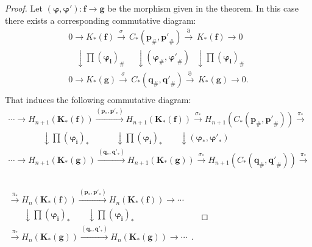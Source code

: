 \documentclass[10pt]{article}
\theoremstyle{definition}
\begin{document}
\begin{proof} Let $\left( {{\mathbf{\varphi }}},\mathbf{{\varphi}' } \right) : { \mathbf{f}} \to {\mathbf{g}}$ be the morphism given in the theorem. In this case there exists a corresponding commutative diagram:
$$
\begin{matrix}
   0\to K_{*} \left( \mathbf{f} \right)\overset{\sigma }{\mathop{\to }}\,{{C}_{*}}\left( {{\mathbf{p}}_{\#}},\mathbf{p'}_{\#} \right)\overset{\partial }{\mathop{\to }}\,K_{*}\left( \mathbf{f} \right)\to 0  \\
   ~~~~\downarrow \prod (\mathbf{\varphi_{i}})_{\#}~~~~~~\downarrow \left( {{\mathbf{\varphi }}_{\#}},\mathbf{{\varphi}' }_{\#} \right)~~~\downarrow \prod (\mathbf{\varphi_{i}})_{\#}  \\
   0\to K_{*} \left( \mathbf{g} \right)\overset{\sigma }{\mathop{\to }}\,{{C}_{*}}\left( {{\mathbf{q}}_{\#}},\mathbf{q'}_{\#} \right)\overset{\partial }{\mathop{\to }}\,K_{*}\left( \mathbf{g} \right)\to 0.  \\
\end{matrix}
$$
That induces the following commutative diagram:
$$
\begin{matrix}
   \cdots \to H_{n+1}(\mathbf K_{*}( \mathbf{f})){{\stackrel{(\mathbf p_{*},\mathbf {p'}_{*})}{\longrightarrow}}} H_{n+1}(\mathbf K_{*}( \mathbf{f})){{\stackrel{\sigma
_{*}}{\longrightarrow}}}H_{n+1}(C_{*}(\mathbf p_\#,{\mathbf {p'}}_{\#}))  {{\stackrel{\pi _{*}}{\longrightarrow}}} \\
   ~~~~~~~~~~~~~~~~~~\downarrow \prod (\mathbf{\varphi_{i}})_{*}~~~~~~~~~~~~~~\downarrow \prod (\mathbf{\varphi_{i}})_{*}~~~~~~~~~\downarrow \left( {{\mathbf{\varphi }}_{*}},\mathbf{{\varphi}' }_{*} \right)~~~~~~~~~~~~~~~~ \\
   \cdots \to H_{n+1}(\mathbf K_{*}( \mathbf{g})){{\stackrel{(\mathbf q_{*},\mathbf {q'}_{*})}{\longrightarrow}}} H_{n+1}(\mathbf K_{*}( \mathbf{g})){{\stackrel{\sigma
_{*}}{\longrightarrow}}}H_{n+1}(C_{*}(\mathbf q_\#,{\mathbf {q'}}_{\#}))  {{\stackrel{\pi _{*}}{\longrightarrow}}} \\
\end{matrix}
$$
~~~~~~~~~~~~~~~~~~~~~~~~~~~~~~~~~~~~~~~~~~~~~~~~~~~~~~~~$
\begin{matrix}
   {{\stackrel{\pi _{*}}{\longrightarrow}}}{H_{n}(\mathbf K_{*}( \mathbf{f}))}{{\stackrel{(\mathbf p_{*},\mathbf {p'}_{*})}{\longrightarrow}}}H_{n}(\mathbf K_{*}( \mathbf{f}))\to \cdots   \\
   ~~~~~~~~\downarrow \prod (\mathbf{\varphi_{i}})_{*} ~~~~~~~~~\downarrow \prod (\mathbf{\varphi_{i}})_{*} \\
   {{\stackrel{\pi _{*}}{\longrightarrow}}}{H_{n}(\mathbf K_{*}( \mathbf{g}))}{{\stackrel{(\mathbf q_{*},\mathbf {q'}_{*})}{\longrightarrow}}}H_{n}(\mathbf K_{*}( \mathbf{g}))\to \cdots~~.  \\
\end{matrix}
$


\end{proof}
\end{document}
